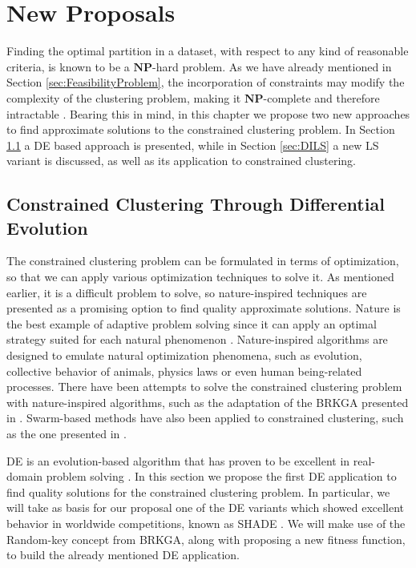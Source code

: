 \chapter{New Proposals}\label{ch:NewProposals}

Finding the optimal partition in a dataset, with respect to any kind of reasonable criteria, is known to be a $\mathbf{NP}$-hard problem. As we have already mentioned in Section \ref{sec:FeasibilityProblem}, the incorporation of constraints may modify the complexity of the clustering problem, making it $\mathbf{NP}$-complete and therefore intractable \cite{davidson2005clustering}. Bearing this in mind, in this chapter we propose two new approaches to find approximate solutions to the constrained clustering problem. In Section \ref{sec:CCSHADE} a \acf{DE} based approach is presented, while in Section \ref{sec:DILS} a new \acf{LS} variant is discussed, as well as its application to constrained clustering.


\section{Constrained Clustering Through Differential Evolution} \label{sec:CCSHADE}

The constrained clustering problem can be formulated in terms of optimization, so that we can apply various optimization techniques to solve it. As mentioned earlier, it is a difficult problem to solve, so nature-inspired techniques are presented as a promising option to find quality approximate solutions. Nature is the best example of adaptive problem solving since it can apply an optimal strategy suited for each natural phenomenon \cite{fausto2019ants}. Nature-inspired algorithms are designed to emulate natural optimization phenomena, such as evolution, collective behavior of animals, physics laws or even human being-related processes. There have been attempts to solve the constrained clustering problem with nature-inspired algorithms, such as the adaptation of the \acf{BRKGA} presented in \cite{de2017comparison}. Swarm-based methods have also been applied to constrained clustering, such as the one presented in \cite{xu2013improving}.

\acs{DE} is an evolution-based algorithm that has proven to be excellent in real-domain problem solving \cite{das2011differential}. In this section we propose the first \acs{DE} application to find quality solutions for the constrained clustering problem. In particular, we will take as basis for our proposal one of the \acs{DE} variants which showed excellent behavior in worldwide competitions, known as SHADE \cite{molina2018insight}. We will make use of the Random-key concept from \acs{BRKGA}, along with proposing a new fitness function, to build the already mentioned \acs{DE} application.


